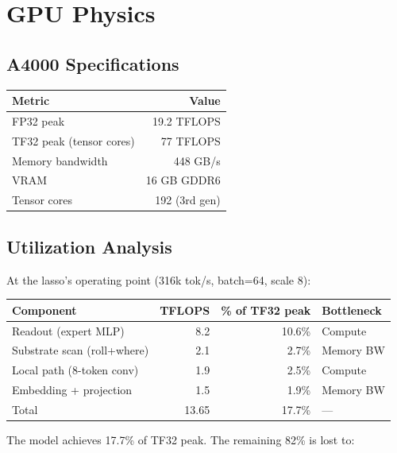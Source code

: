 \documentclass[11pt,a4paper]{report}
\begin{document}
\chapter{GPU Physics}

\section{A4000 Specifications}

\begin{center}
\begin{tabular}{lr}
\toprule
Metric & Value \\
\midrule
FP32 peak & 19.2 TFLOPS \\
TF32 peak (tensor cores) & 77 TFLOPS \\
Memory bandwidth & 448 GB/s \\
VRAM & 16 GB GDDR6 \\
Tensor cores & 192 (3rd gen) \\
\bottomrule
\end{tabular}
\end{center}

\section{Utilization Analysis}

At the lasso's operating point (316k tok/s, batch=64, scale 8):

\begin{center}
\begin{tabular}{lrrl}
\toprule
Component & TFLOPS & \% of TF32 peak & Bottleneck \\
\midrule
Readout (expert MLP) & 8.2 & 10.6\% & Compute \\
Substrate scan (roll+where) & 2.1 & 2.7\% & Memory BW \\
Local path (8-token conv) & 1.9 & 2.5\% & Compute \\
Embedding + projection & 1.5 & 1.9\% & Memory BW \\
\midrule
Total & 13.65 & 17.7\% & --- \\
\bottomrule
\end{tabular}
\end{center}

The model achieves 17.7\% of TF32 peak. The remaining 82\% is lost to:
\end{document}
